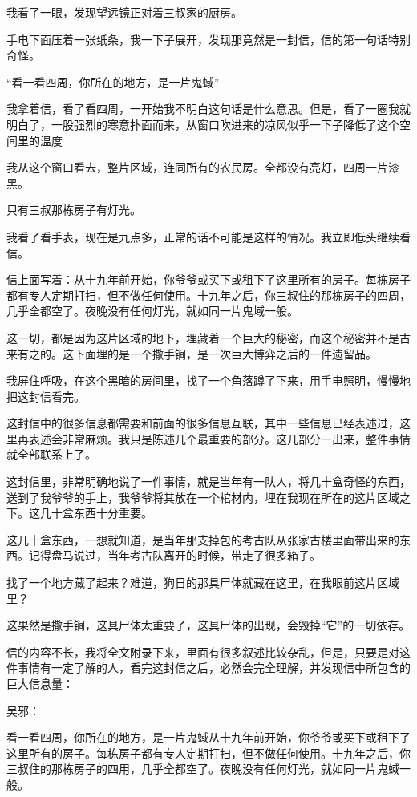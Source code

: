 我看了一眼，发现望远镜正对着三叔家的厨房。

手电下面压着一张纸条，我一下子展开，发现那竟然是一封信，信的第一句话特别奇怪。

“看一看四周，你所在的地方，是一片鬼蜮”

我拿着信，看了看四周，一开始我不明白这句话是什么意思。但是，看了一圈我就明白了，一股强烈的寒意扑面而来，从窗口吹进来的凉风似乎一下子降低了这个空间里的温度

我从这个窗口看去，整片区域，连同所有的农民房。全都没有亮灯，四周一片漆黑。

只有三叔那栋房子有灯光。

我看了看手表，现在是九点多，正常的话不可能是这样的情况。我立即低头继续看信。

信上面写着：从十九年前开始，你爷爷或买下或租下了这里所有的房子。每栋房子都有专人定期打扫，但不做任何使用。十九年之后，你三叔住的那栋房子的四周，几乎全都空了。夜晚没有任何灯光，就如同一片鬼域一般。

这一切，都是因为这片区域的地下，埋藏着一个巨大的秘密，而这个秘密并不是古来有之的。这下面埋的是一个撒手锏，是一次巨大博弈之后的一件遗留品。

我屏住呼吸，在这个黑暗的房间里，找了一个角落蹲了下来，用手电照明，慢慢地把这封信看完。

这封信中的很多信息都需要和前面的很多信息互联，其中一些信息已经表述过，这里再表述会非常麻烦。我只是陈述几个最重要的部分。这几部分一出来，整件事情就全部联系上了。

这封信里，非常明确地说了一件事情，就是当年有一队人，将几十盒奇怪的东西，送到了我爷爷的手上，我爷爷将其放在一个棺材内，埋在我现在所在的这片区域之下。这几十盒东西十分重要。

这几十盒东西，一想就知道，是当年那支掉包的考古队从张家古楼里面带出来的东西。记得盘马说过，当年考古队离开的时候，带走了很多箱子。

找了一个地方藏了起来？难道，狗日的那具尸体就藏在这里，在我眼前这片区域里？

这果然是撒手锏，这具尸体太重要了，这具尸体的出现，会毁掉“它”的一切依存。

信的内容不长，我将全文附录下来，里面有很多叙述比较杂乱，但是，只要是对这件事情有一定了解的人，看完这封信之后，必然会完全理解，并发现信中所包含的巨大信息量：

吴邪：

看一看四周，你所在的地方，是一片鬼蜮从十九年前开始，你爷爷或买下或租下了这里所有的房子。每栋房子都有专人定期打扫，但不做任何使用。十九年之后，你三叔住的那栋房子的四用，几乎全都空了。夜晚没有任何灯光，就如同一片鬼蜮一般。

